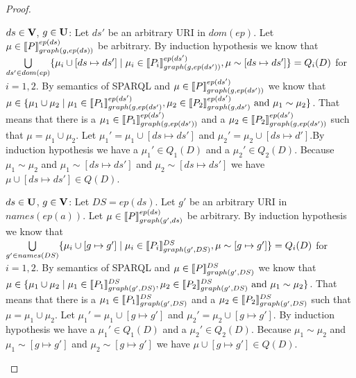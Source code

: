 \begin{proof}
\begin{enumerate}
			\bigskip\noindent
			$ds \in \mathbf{V}$, $g \in \mathbf{U}$:
			Let $ds'$ be an arbitrary URI in $dom(ep)$.
			Let $\mu \in \llbracket P \rrbracket^{ep(ds)}_{graph(g,ep(ds))}$ be arbitrary. 
			By induction hypothesis we know that
			$\bigcup\limits_{ds' \in dom(ep)} \{\mu_i \cup [ds \mapsto ds' ] \mid 
				\mu_i \in \llbracket P_i \rrbracket^{ep(ds')}_{graph(g,ep(ds'))}, \mu \sim [ds
			\mapsto ds']\}  = Q_i(D)$
			for $i = 1,2$.
			By semantics of SPARQL and 
			$\mu \in \llbracket P \rrbracket^{ep(ds')}_{graph(g,ep(ds'))}$ we know that 
			$\mu \in \{\mu_1 \cup \mu_2 \mid \mu_1 \in \llbracket P_1 \rrbracket^{ep(ds')}_{graph(g,ep(ds')}, 
				\mu_2 \in \llbracket P_2 \rrbracket^{ep(ds')}_{graph(g,ds')}\\ 
			\mbox{ and }  \mu_1 \sim \mu_2\}$. 
			That means that there is a $\mu_1 \in \llbracket P_1 \rrbracket_{graph(g,ep(ds'))}^{ep(ds')}$ 
			and a $\mu_2 \in \llbracket P_2 \rrbracket^{ep(ds')}_{graph(g,ep(ds'))}$ such that $\mu = \mu_1 \cup \mu_2$.
			Let  $\mu_1'= \mu_1\cup[ds\mapsto ds'] $ and $\mu_2' = \mu_2\cup[ds\mapsto
			d']$.By induction hypothesis we have a $\mu_1' \in Q_1(D)$ and a $\mu_2' \in
			Q_2(D)$.
			Because $\mu_1 \sim \mu_2$ and $\mu_1 \sim [ds\mapsto ds']$ and $\mu_2 \sim [ds
			\mapsto ds']$ we have $\mu \cup [ds\mapsto ds'] \in Q(D)$.

			\bigskip\noindent
			$ds \in \mathbf{U}$, $g \in \mathbf{V}$: Let $DS = ep(ds)$.
			Let $g'$ be an arbitrary URI in $names(ep(a))$.
			Let $\mu \in \llbracket P \rrbracket^{ep(ds)}_{graph(g',ds)}$ be arbitrary. 
			By induction hypothesis we know that
			$\bigcup\limits_{g' \in names(DS)}\{\mu_i \cup [g \mapsto g' ] \mid 
				\mu_i \in \llbracket P_i \rrbracket^{DS}_{graph(g',DS)}, \mu \sim [g
			\mapsto g']\} = Q_i(D)$ for  $i = 1,2$.
			By semantics of SPARQL and $\mu \in \llbracket P \rrbracket^{DS}_{graph(g',DS)}$ we know that 
			$\mu \in \{\mu_1 \cup \mu_2 \mid \mu_1 \in \llbracket P_1 \rrbracket^{DS}_{graph(g',DS)}, \mu_2 \in \llbracket
			P_2 \rrbracket^{DS}_{graph(g',DS)}\\ \mbox{ and }  \mu_1 \sim \mu_2\}$. 
			That means that there is a $\mu_1 \in \llbracket P_1 \rrbracket_{graph(g',DS)}^{DS}$ 
			and a $\mu_2 \in \llbracket P_2 \rrbracket^{DS}_{graph(g',DS)}$ such that $\mu = \mu_1 \cup \mu_2$.
			 Let $\mu_1' =  \mu_1\cup[g\mapsto g']$ and $\mu_2' = \mu_2\cup[g\mapsto g']$.
			 By induction hypothesis we have a $\mu_1' \in Q_1(D)$ and a $\mu_2' \in
			Q_2(D)$.
			Because $\mu_1 \sim \mu_2$ and $\mu_1 \sim [g\mapsto g']$ and $\mu_2 \sim [g
			\mapsto g']$ we have $\mu \cup [g\mapsto g'] \in Q(D)$.


\end{enumerate}
\end{proof}
